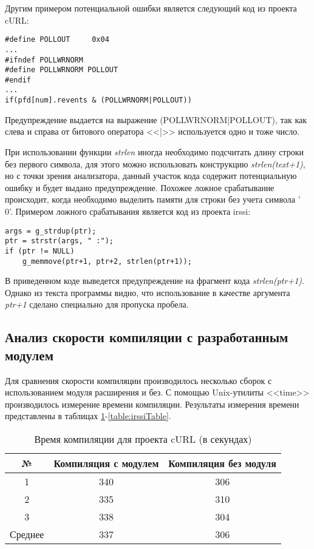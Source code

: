 Другим примером потенциальной ошибки является следующий код из проекта cURL:
\begin{lstlisting}
#define POLLOUT     0x04
...
#ifndef POLLWRNORM
#define POLLWRNORM POLLOUT
#endif
...
if(pfd[num].revents & (POLLWRNORM|POLLOUT))
\end{lstlisting}
Предупреждение выдается на выражение (POLLWRNORM|POLLOUT), так как слева и справа от битового оператора
<<|>> используется одно и тоже число. 

При использовании функции \textit{strlen} иногда необходимо подсчитать длину строки без первого
символа, для этого можно использовать конструкцию \textit{strlen(text+1)}, но с точки зрения анализатора,
данный участок кода содержит потенциальную ошибку и будет выдано предупреждение. Похожее ложное 
срабатывание происходит, когда необходимо выделить памяти для строки без учета символа '\\0'. 
Примером ложного срабатывания является код из проекта irssi:
\begin{lstlisting}
args = g_strdup(ptr);
ptr = strstr(args, " :");
if (ptr != NULL)
	g_memmove(ptr+1, ptr+2, strlen(ptr+1));
\end{lstlisting}
В приведенном коде выведется предупреждение на фрагмент кода {\em strlen(ptr+1)}.
Однако из текста программы видно, что использование в качестве аргумента {\em ptr+1} сделано
специально для пропуска пробела.   
    
\subsection*{Анализ скорости компиляции с разработанным модулем}
Для сравнения скорости компиляции производилось несколько сборок с использованием модуля расширения и без.
С помощью Unix-утилиты <<time>> производилось измерение времени компиляции. 
Результаты измерения времени представлены в таблицах \ref{table:curlTable}-\ref{table:irssiTable}.
\begin{table}[h!]
\caption{Время компиляции для проекта cURL (в секундах)}
\label{table:curlTable}
\centering
\begin{tabular}{| c | c | c |}
\hline
№ & Компиляция с модулем & Компиляция без модуля \\
\hline
1 & 340 & 306 \\
2 & 335 & 310 \\
3 & 338 & 304 \\
Среднее & 337 & 306 \\
\hline
\end{tabular}
\end{table}

